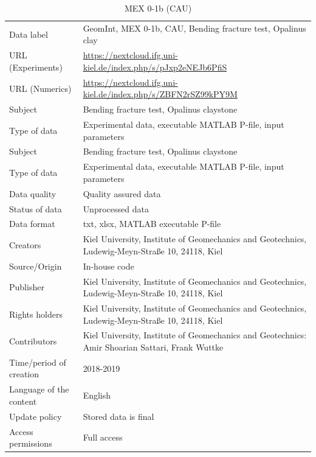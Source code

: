 \begin{table}[!ht]
\caption{MEX 0-1b (CAU)}
\label{tab:dms-mex0-1b}
\small
\begin{tabular}{R{3.5cm}|L{7.5cm}}
\hline
%
Data label & GeomInt, MEX 0-1b, CAU, Bending fracture test, Opalinus clay \\
URL (Experiments) & \url{https://nextcloud.ifg.uni-kiel.de/index.php/s/pJxp2eNEJb6PfiS} \\
URL (Numerics) & \url{https://nextcloud.ifg.uni-kiel.de/index.php/s/ZBFN2rSZ99kPY9M} \\
Subject  &  Bending fracture test, Opalinus claystone\\
Type of data  &  Experimental data, executable MATLAB P-file, input parameters\\
Subject  &  Bending fracture test, Opalinus claystone\\
Type of data  &  Experimental data, executable MATLAB P-file, input parameters\\
Data quality  &  Quality assured data \\
Status of data  &  Unprocessed data\\
Data format  & txt, xlsx, MATLAB executable P-file\\
Creators  &  Kiel University, Institute of Geomechanics and Geotechnics, Ludewig-Meyn-Stra\ss e 10, 24118, Kiel\\
Source/Origin & In-house code \\
Publisher  &  Kiel University, Institute of Geomechanics and Geotechnics, Ludewig-Meyn-Stra\ss e 10, 24118, Kiel \\
Rights holders &  Kiel University, Institute of Geomechanics and Geotechnics, Ludewig-Meyn-Stra\ss e 10, 24118, Kiel \\
Contributors &   Kiel University, Institute of Geomechanics and Geotechnics: Amir Shoarian Sattari, Frank Wuttke\\
Time/period of creation &  2018-2019\\
Language of the content &  English\\
Update policy &  Stored data is final\\
Access permissions & Full access\\
%
\hline
\end{tabular}
\end{table}

